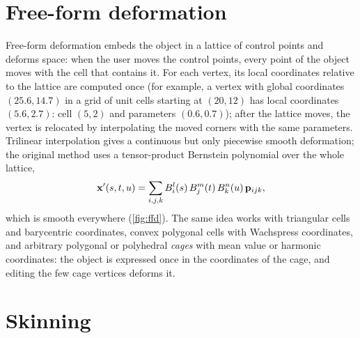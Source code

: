 
\section{Free-form deformation}

Free-form deformation \citep{Sederberg1986} embeds the object in a lattice of control points and
deforms space: when the user moves the control points, every point of the object moves with the
cell that contains it. For each vertex, its local coordinates relative to the lattice are computed
once (for example, a vertex with global coordinates $(25.6,14.7)$ in a grid of unit cells starting at
$(20,12)$ has local coordinates $(5.6,2.7)$: cell $(5,2)$ and parameters $(0.6,0.7)$); after the
lattice moves, the vertex is relocated by interpolating the moved corners with the same
parameters. Trilinear interpolation gives a continuous but only piecewise smooth deformation; the
original method uses a tensor-product Bernstein polynomial over the whole lattice,
\begin{equation}
\mathbf{x}'(s,t,u)=\sum_{i,j,k}B_i^l(s)\,B_j^m(t)\,B_k^n(u)\,\mathbf{p}_{ijk},
\end{equation}
which is smooth everywhere (\cref{fig:ffd}). The same idea works with triangular cells and
barycentric coordinates, convex polygonal cells with Wachspress coordinates, and arbitrary
polygonal or polyhedral \emph{cages} with mean value or harmonic coordinates: the object is
expressed once in the coordinates of the cage, and editing the few cage vertices deforms it.


\section{Skinning}

